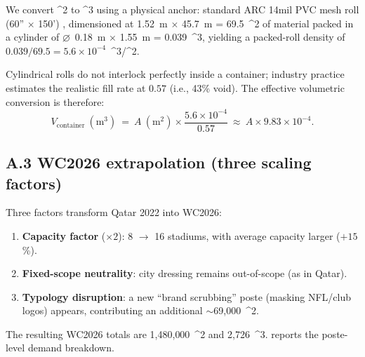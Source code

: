 \documentclass[11pt,a4paper]{article}
\numberwithin{equation}{section}
\newcommand{\mcube}{\text{m}^{3}}
\newcommand{\msq}{\text{m}^{2}}
\begin{document}
We convert \msq{} to \mcube{} using a physical anchor: standard ARC 14mil PVC mesh roll (60'' $\times$ 150') \cite{arcsupplies_rolls}, dimensioned at 1.52~m $\times$ 45.7~m = 69.5~\msq{} of material packed in a cylinder of $\varnothing$~0.18~m $\times$ 1.55~m = 0.039~\mcube{}, yielding a packed-roll density of $0.039/69.5 = 5.6\times 10^{-4}$~\mcube/\msq.

Cylindrical rolls do not interlock perfectly inside a container; industry practice estimates the realistic fill rate at $0.57$ (i.e., 43\% void). The effective volumetric conversion is therefore:
\[
V_{\text{container}}\ (\mcube)\ =\ A\ (\msq) \times \frac{5.6 \times 10^{-4}}{0.57}\ \approx\ A \times 9.83 \times 10^{-4}.
\]

\subsection*{A.3 WC2026 extrapolation (three scaling factors)}

Three factors transform Qatar 2022 into WC2026:
\begin{enumerate}[leftmargin=*,itemsep=2pt,topsep=2pt]
\item \textbf{Capacity factor} ($\times 2$): 8 $\to$ 16 stadiums, with average capacity larger ($+15$\%).
\item \textbf{Fixed-scope neutrality}: city dressing remains out-of-scope (as in Qatar).
\item \textbf{Typology disruption}: a new ``brand scrubbing'' poste (masking NFL/club logos) appears, contributing an additional $\sim$69{,}000~\msq{}.
\end{enumerate}
The resulting WC2026 totals are 1{,}480{,}000~\msq{} and 2{,}726~\mcube.  reports the poste-level demand breakdown.
\end{document}
